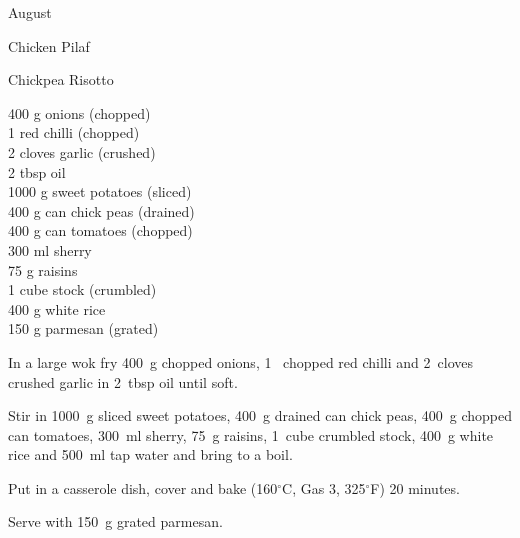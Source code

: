 \begin{menu}{August}
\begin{recipe}{2}{Chicken Pilaf}
\begin{instructions}
    \end{instructions}
    \end{recipe}%
  
    \begin{recipe}{2}{Chickpea Risotto}%
		\begin{ingredients}
		400 g onions (chopped) \\
	1  red chilli (chopped) \\
	2 cloves garlic (crushed) \\
	2 tbsp oil  \\
	1000 g sweet potatoes (sliced) \\
	400 g can chick peas (drained) \\
	400 g can tomatoes (chopped) \\
	300 ml sherry  \\
	75 g raisins  \\
	1 cube stock (crumbled) \\
	400 g white rice  \\
	150 g parmesan (grated) \\
	
		\end{ingredients}
	
    \begin{instructions}
    \item 
        In a large wok fry
        400~g chopped onions,
        1~ chopped red chilli
        and
        2~cloves crushed garlic
        in
        2~tbsp  oil
        until soft.
      \item 
        Stir in
        1000~g sliced sweet potatoes,
        400~g drained can chick peas,
        400~g chopped can tomatoes,
        300~ml  sherry,
        75~g  raisins,
        1~cube crumbled stock,
        400~g  white rice
        and
        500~ml  tap water
        and bring to a boil.
      \item 
        Put in a
        casserole dish,
        cover and bake (160$^{\circ}$C, Gas 3, 325$^{\circ}$F) 20 minutes.
      \item 
        Serve with
        150~g grated parmesan.
      
    \end{instructions}
    \end{recipe}%
  

\end{menu}
